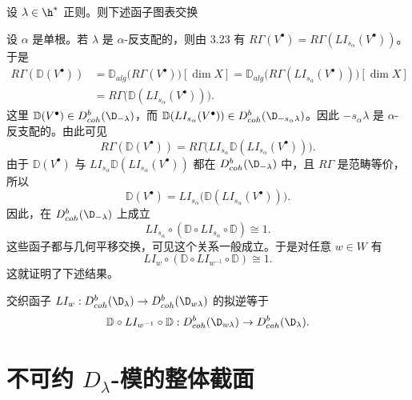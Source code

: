 \begin{lemma}\label{lem:03.4.3}
设 $\lambda\in\h^*$ 正则。则下述函子图表交换
\begin{center}
\end{center}
\end{lemma}

设 $\alpha$ 是单根。若 $\lambda$ 是 $\alpha$-反支配的，则由 3.23 有 $R\Gamma(V^\bullet)=R\Gamma(LI_{s_\alpha}(V^\bullet))$。于是
{\small
\begin{align*}
R\Gamma(\mathbb{D}(V^\bullet))
&=\mathbb{D}_{alg}\bigl(R\Gamma(V^\bullet)\bigr)[\dim X]
=\mathbb{D}_{alg}\bigl(R\Gamma(LI_{s_\alpha}(V^\bullet))\bigr)[\dim X]\\
&=R\Gamma\bigl(\mathbb{D}(LI_{s_\alpha}(V^\bullet))\bigr).
\end{align*}}
这里 $\mathbb{D}(V^\bullet)\in D^b_{coh}(\D_{-\lambda})$，而 $\mathbb{D}(LI_{s_\alpha}(V^\bullet))\in D^b_{coh}(\D_{-s_\alpha\lambda})$。因此 $-s_\alpha\lambda$ 是 $\alpha$-反支配的。由此可见
$$R\Gamma(\mathbb{D}(V^\bullet))=R\Gamma\bigl(LI_{s_\alpha}\mathbb{D}(LI_{s_\alpha}(V^\bullet))\bigr).$$
由于 $\mathbb{D}(V^\bullet)$ 与 $LI_{s_\alpha}\mathbb{D}(LI_{s_\alpha}(V^\bullet))$ 都在 $D^b_{coh}(\D_{-\lambda})$ 中，且 $R\Gamma$ 是范畴等价，所以
$$\mathbb{D}(V^\bullet)=LI_{s_\alpha}\bigl(\mathbb{D}(LI_{s_\alpha}(V^\bullet))\bigr).$$
因此，在 $D^b_{coh}(\D_{-\lambda})$ 上成立
$$LI_{s_\alpha}\circ(\mathbb{D}\circ LI_{s_\alpha}\circ\mathbb{D})\cong 1.$$
这些函子都与几何平移交换，可见这个关系一般成立。于是对任意 $w\in W$ 有
$$LI_w\circ(\mathbb{D}\circ LI_{w^{-1}}\circ\mathbb{D})\cong 1.$$
这就证明了下述结果。

\begin{theorem}\label{thm:03.4.4}
交织函子 $LI_w:D^b_{coh}(\D_\lambda)\to D^b_{coh}(\D_{w\lambda})$ 的拟逆等于
$$\mathbb{D}\circ LI_{w^{-1}}\circ\mathbb{D}:D^b_{coh}(\D_{w\lambda})\to D^b_{coh}(\D_\lambda).$$
\end{theorem}

\section{不可约 $D_\lambda$-模的整体截面}\label{sec:03.3.5}

